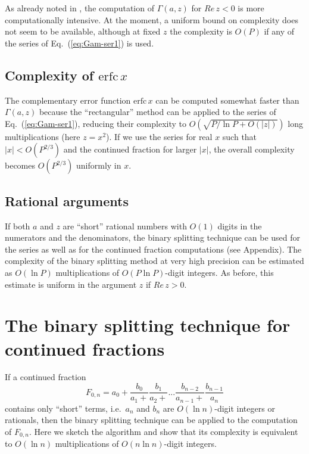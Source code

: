 \documentclass{llncs}
\begin{document}
As already noted in \cite{Gautschi79}, the computation of $\Gamma \left(a,z\right)$
for $Re\, z<0$ is more computationally intensive. At the moment,
a uniform bound on complexity does not seem to be available, although
at fixed $z$ the complexity is $O\left(P\right)$ if any of the series
of Eq.~(\ref{eq:Gam-ser1}) is used.


\subsection{Complexity of $\textrm{erfc}\, x$}

The complementary error function $\textrm{erfc}\, x$ can be computed
somewhat faster than $\Gamma \left(a,z\right)$ because the {}``rectangular''
method can be applied to the series of Eq.~(\ref{eq:Gam-ser1}),
reducing their complexity to $O\left(\sqrt{P/\ln P+O\left(\left|z\right|\right)}\right)$
long multiplications (here $z=x^{2}$). If we use the series for real
$x$ such that $\left|x\right|<O\left(P^{2/3}\right)$ and the continued
fraction for larger $\left|x\right|$, the overall complexity becomes
$O\left(P^{2/3}\right)$ uniformly in $x$.


\subsection{Rational arguments}

If both $a$ and $z$ are {}``short'' rational numbers with $O\left(1\right)$
digits in the numerators and the denominators, the binary splitting
technique can be used for the series as well as for the continued
fraction computations (see Appendix). The complexity of the binary
splitting method at very high precision can be estimated as $O\left(\ln P\right)$
multiplications of $O\left(P\ln P\right)$-digit integers. As before,
this estimate is uniform in the argument $z$ if $Re\, z>0$.

\appendix

\section{The binary splitting technique for continued fractions}

If a continued fraction\begin{equation}
F_{0,n}=a_{0}+\frac{b_{0}}{a_{1}+}\frac{b_{1}}{a_{2}+}...\frac{b_{n-2}}{a_{n-1}+}\frac{b_{n-1}}{a_{n}}\label{eq:F0ndef}\end{equation}
contains only {}``short'' terms, i.e.~$a_{n}$ and $b_{n}$ are
$O\left(\ln n\right)$-digit integers or rationals, then the binary
splitting technique can be applied to the computation of $F_{0,n}$.
Here we sketch the algorithm and show that its complexity is equivalent
to $O\left(\ln n\right)$ multiplications of $O\left(n\ln n\right)$-digit
integers.
\end{document}
